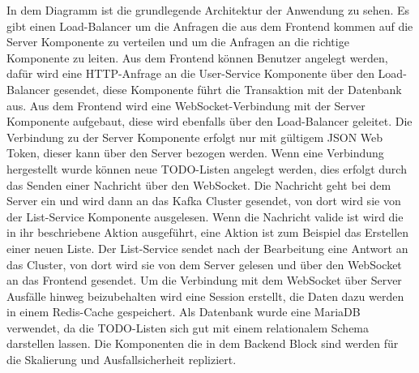 In dem Diagramm ist die grundlegende Architektur der Anwendung zu sehen. Es gibt einen Load-Balancer um die Anfragen die aus dem Frontend kommen auf die Server Komponente zu verteilen und um die Anfragen an die richtige Komponente zu leiten. Aus dem Frontend können Benutzer angelegt werden, dafür wird eine HTTP-Anfrage an die User-Service Komponente über den Load-Balancer gesendet, diese Komponente führt die Transaktion mit der Datenbank aus. Aus dem Frontend wird eine WebSocket-Verbindung mit der Server Komponente aufgebaut, diese wird ebenfalls über den Load-Balancer geleitet. Die Verbindung zu der Server Komponente erfolgt nur mit gültigem JSON Web Token, dieser kann über den Server bezogen werden. Wenn eine Verbindung hergestellt wurde können neue TODO-Listen angelegt werden, dies erfolgt durch das Senden einer Nachricht über den WebSocket. Die Nachricht geht bei dem Server ein und wird dann an das Kafka Cluster gesendet, von dort wird sie von der List-Service Komponente ausgelesen. Wenn die Nachricht valide ist wird die in ihr beschriebene Aktion ausgeführt, eine Aktion ist zum Beispiel das Erstellen einer neuen Liste. Der List-Service sendet nach der Bearbeitung eine Antwort an das Cluster, von dort wird sie von dem Server gelesen und über den WebSocket an das Frontend gesendet. Um die Verbindung mit dem WebSocket über Server Ausfälle hinweg beizubehalten wird eine Session erstellt, die Daten dazu werden in einem Redis-Cache gespeichert. Als Datenbank wurde eine MariaDB verwendet, da die TODO-Listen sich gut mit einem relationalem Schema darstellen lassen. Die Komponenten die in dem Backend Block sind werden für die Skalierung und Ausfallsicherheit repliziert.


